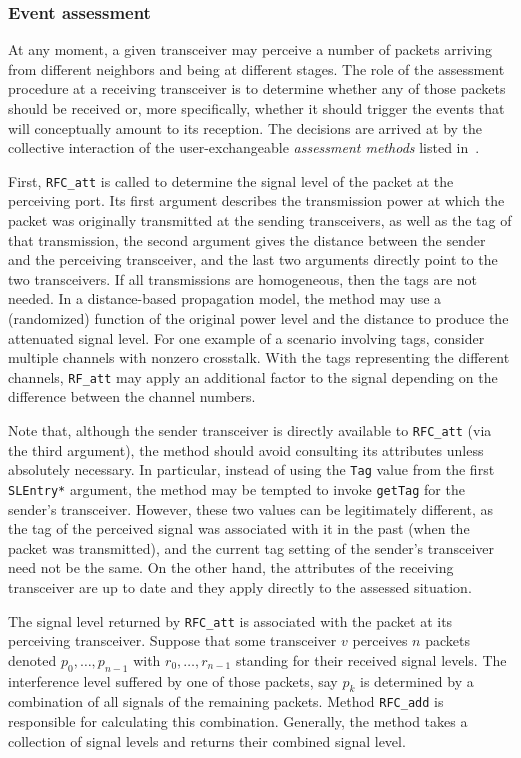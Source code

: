 \subsubsection{Event assessment}
\label{rm_tr_ra_ea}

At any moment, a given transceiver may perceive a number of packets arriving
from different neighbors and being at different stages.
The role of the assessment procedure at a receiving transceiver is to
determine whether any of those packets should be received or, more
specifically, whether it should trigger the events that will conceptually
amount to its reception.
The decisions are arrived at by the collective interaction of the
user-exchangeable {\em assessment methods\/} listed in~.

First, {\tt RFC\_att} is called to
determine the signal level of the packet at the
perceiving port.
Its first argument describes the transmission power at which
the packet was originally transmitted at the sending transceivers,
as well as the tag of that transmission,
the second argument gives the distance between
the sender and the perceiving transceiver, and the last two arguments
directly point to the two transceivers.
If all transmissions are homogeneous, then the tags are not needed.
In a distance-based propagation model, the method may use a (randomized)
function of the original power level and the distance to produce the
attenuated signal level.
For one example of a scenario involving tags, consider multiple channels
with nonzero crosstalk.
With the tags representing the different channels, {\tt RF\_att} may apply an
additional factor to the signal depending on the difference
between the channel numbers.

Note that, although the sender transceiver is directly available
to {\tt RFC\_att} (via the third argument), the method
should avoid consulting its attributes unless absolutely necessary.
In particular, instead of using the {\tt Tag} value from the
first {\tt SLEntry*} argument, the method may be tempted to invoke
{\tt getTag} for the sender's transceiver.
However,
these two values can be legitimately different, as the tag of the perceived
signal was associated with it in the past (when the packet was transmitted),
and the current tag setting of the sender's transceiver need not be the same.
On the other hand, the attributes of the receiving transceiver are up to date
and they apply directly to the assessed situation.

The signal level returned by {\tt RFC\_att} is associated with the packet
at its perceiving transceiver.
Suppose that some transceiver $v$ perceives $n$ packets denoted
$p_0, \ldots , p_{n-1}$ with $r_0, \ldots , r_{n-1}$ standing for their
received signal levels.
The interference level suffered by one of those packets,
say $p_k$ is determined by 
a combination of all signals of the remaining packets.
Method {\tt RFC\_add} is responsible for calculating this combination.
Generally, the method takes a collection of signal levels and returns
their combined signal level.

